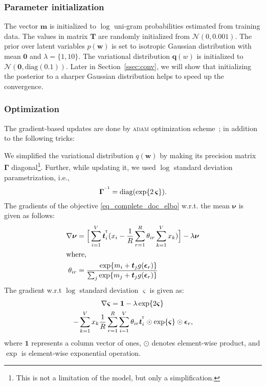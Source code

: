 \documentclass[journal]{IEEEtran}
\newcommand*{\T}{^{\mkern-1.2mu\mathsf{T}}}     \newcommand*{\I}{^{\mkern-1.2mu\mathsf{-1}}}    \newcommand*{\IT}{^{\mkern-1.2mu\mathsf{-T}}}   \newcommand*{\ts}{_{\mkern-1.2mu\mathsf{t}}}    \newcommand{\nr}[1]{_{\mkern+2.0mu\mathsf{#1}}}
\newcommand{\mb}[1]{\bm{#1}}
\newcommand{\bs}[1]{\bm{#1}}
\newcommand{\myfrac}[2]{\setbox0\hbox{$#1$}        \dimen0=\wd0               \setbox1\hbox{$#2$}        \dimen1=\wd1               \ifdim\wd0<\wd1            \dfrac{\hfill#1}{#2}     \else
	\dfrac{#1}{\hfill#2}     \fi
}
\begin{document}
\subsubsection{Parameter initialization}
\label{ssec:param_init}
The vector \(\mb{m}\) is initialized to \(\log\) uni-gram probabilities
estimated from  training data. The values in matrix \(\mb{T}\) are randomly 
initialized from \(\mathcal{N}(0, 0.001)\). The prior over latent variables 
\(p(\mb{w})\) is set to isotropic Gaussian distribution with mean \(\mb{0}\)
and \(\lambda = \{1, 10\}\).
The variational distribution \(\mb{q}(w)\) is initialized to 
\(\mathcal{N}(\mb{0}, \mathrm{diag}(0.1))\). Later in Section~\ref{ssec:conv}, 
we will show that initializing the posterior to a sharper Gaussian distribution 
helps to speed up the convergence.


\subsubsection{Optimization}
\label{ssec:optim}
The gradient-based updates are done by \textsc{adam} optimization scheme~\cite{Kingma:2014:Adam}; in addition to the following tricks:

We simplified the variational distribution \(q(\mb{w})\) by making its 
precision matrix \(\bs{\Gamma}\) diagonal\footnote{This is not a limitation of 
the model, but only a simplification.}. Further, while 
updating it, we used \(\log\) 
standard deviation parametrization, i.e.,
\begin{equation}
\bs{\Gamma}^{\I} = \mathrm{diag}(\exp\{2\,\bs{\varsigma}\}).
\end{equation}
The gradients of the objective \eqref{eq_complete_doc_elbo} w.r.t. the mean 
\(\bs{\nu}\) is given as follows:
\begin{align}
\label{eq_grad_nu}
\nabla \bs{\nu} &= \Big[\sum_{i=1}^{V} \mb{t}_i^{\T}(x_i - \frac{1}{R}\sum_{r=1}^{R}\theta_{ir} \sum_{k=1}^{V}x_k )  \Big] - \lambda \bs{\nu} \\
\intertext{where,}
\theta_{ir} &= \myfrac{\exp\{m_i + \mb{t}_jg(\bs{\epsilon}_r)\}}{\sum_j \exp\{m_j + \mb{t}_jg(\bs{\epsilon}_r)\}} \label{eq_theta_ir}
\end{align}
The gradient w.r.t \(\log\) standard deviation \(\bs{\varsigma}\) is given as:
\begin{multline}
\label{eq_grad_lstd}
\nabla \bs{\varsigma} =  \mb{1} - \lambda \exp\{2 \bs{\varsigma}\} \, \\
- \sum_{k=1}^{V} x_k\frac{1}{R}\sum_{r=1}^{R}\sum_{i=1}^{V}\theta_{ir} \mb{t}_i^{\T} \odot \exp\{\bs{\varsigma}\} \odot \bs{\epsilon}_r,
\end{multline}
where \(\mb{1}\) represents a column vector of ones, \(\odot\) denotes 
element-wise product, and \(\exp\) is element-wise exponential operation.
\end{document}
